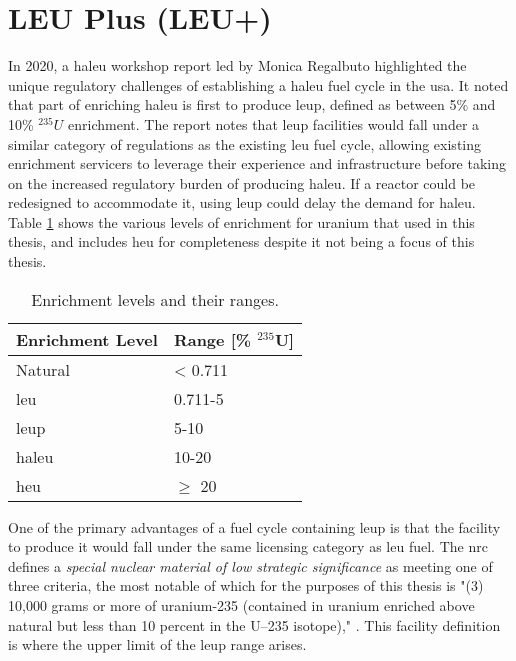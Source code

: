 \section{LEU Plus (LEU+)}
\label{sec:leup}

In 2020, a \gls{haleu} workshop report led by Monica Regalbuto \cite{regalbuto_high_assay_2020} highlighted the unique regulatory challenges of establishing a \gls{haleu} fuel cycle in the \gls{usa}. It noted that part of enriching \gls{haleu} is first to produce \gls{leup}, defined as between 5\% and 10\% $^{235}U$ enrichment. The report notes that \gls{leup} facilities would fall under a similar category of regulations as the existing \gls{leu} fuel cycle, allowing existing enrichment servicers to leverage their experience and infrastructure before taking on the increased regulatory burden of producing \gls{haleu}. If a reactor could be redesigned to accommodate it, using \gls{leup} could delay the demand for \gls{haleu}. Table \ref{tab:enrichment_levels} shows the various levels of enrichment for uranium that used in this thesis, and includes \gls{heu} for completeness despite it not being a focus of this thesis.

\begin{table}[H]
   \centering
   \caption{Enrichment levels and their ranges.}
   \label{tab:enrichment_levels}
   \begin{tabular}{l l}
      \hline
      \textbf{Enrichment Level} & \textbf{Range [\%  $^{235}$U]} \\
      \hline
      Natural & < 0.711 \\
      \gls{leu} & 0.711-5 \\
      \gls{leup} & 5-10 \\
      \gls{haleu} & 10-20 \\
      \gls{heu} & $\geq$ 20  \\
      \hline
   \end{tabular}
\end{table}

One of the primary advantages of a fuel cycle containing \gls{leup} is that the facility to produce it would fall under the same licensing category as \gls{leu} fuel. The \gls{nrc} defines a \textit{special nuclear material of low strategic significance} as meeting one of three criteria, the most notable of which for the purposes of this thesis is "(3) 10,000 grams or more of uranium-235 (contained in uranium enriched above natural but less than 10 percent in the U–235 isotope)," \cite{nrc_catiii}. This facility definition is where the upper limit of the \gls{leup} range arises.

